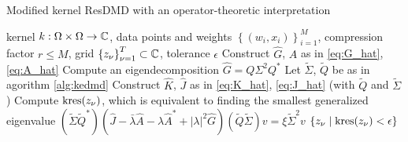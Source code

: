 \begin{algorithm}
    \caption{Modified kernel ResDMD with an operator-theoretic interpretation}
    \label{alg:kresdmd_correct}
    \begin{algorithmic}[1]
        \Require kernel $k : \Omega \times \Omega \to \mathbb{C}$, data points and weights 
            $\left\{ (w_i, x_i) \right\}_{i=1}^M$, compression factor $r \leq M$,
            grid $\left\{ z_\nu \right\}_{\nu=1}^T \subset \mathbb{C}$,
            tolerance $\epsilon$
        \State Construct $\widehat{G}$, $\widehat{A}$ as in \ref{eq:G_hat}, \ref{eq:A_hat}
        \State Compute an eigendecomposition $\widehat{G} = Q \Sigma^2 Q^*$
        \State Let $\widetilde{\Sigma}$, $\widetilde{Q}$ be as in agorithm \ref{alg:kedmd}
        \State Construct $\widehat{ K }$, $\widehat{ J }$ as in \ref{eq:K_hat}, 
            \ref{eq:J_hat} (with $\widetilde{ Q }$ and $\widetilde{ \Sigma }$)
        \State Compute $\text{kres} (z_\nu)$, which is equivalent 
            to finding the smallest generalized eigenvalue 
            $\left( \widetilde{ \Sigma } \widetilde{ Q }^* \right) 
            \left( 
                \widehat{ J }
                - \bar{\lambda} \widehat{ A } 
                - \lambda \widehat{ A }^* 
                + | \lambda |^2 \widehat{ G }
            \right)
            \left( \widetilde{ Q } \widetilde{ \Sigma } \right) v
            = \xi \widetilde{ \Sigma }^{2} v$
        \EndFor
        \State \Return $\left\{ z_\nu \mid \text{kres} (z_\nu) < \epsilon \right\}$
    \end{algorithmic}
\end{algorithm}


